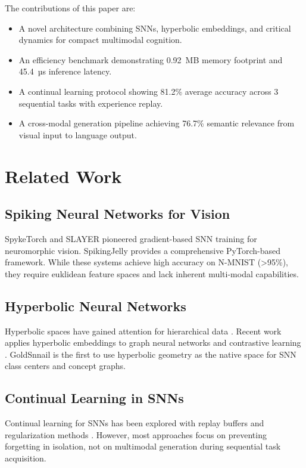 \documentclass[conference]{IEEEtran}
\begin{document}
The contributions of this paper are:
\begin{itemize}
    \item A novel architecture combining SNNs, hyperbolic embeddings, and critical dynamics for compact multimodal cognition.
    \item An efficiency benchmark demonstrating 0.92~MB memory footprint and 45.4~µs inference latency.
    \item A continual learning protocol showing 81.2\% average accuracy across 3 sequential tasks with experience replay.
    \item A cross-modal generation pipeline achieving 76.7\% semantic relevance from visual input to language output.
\end{itemize}

\section{Related Work}

\subsection{Spiking Neural Networks for Vision}
SpykeTorch \cite{spiketorch} and SLAYER \cite{slayer} pioneered gradient-based SNN training for neuromorphic vision. SpikingJelly \cite{spikingjelly} provides a comprehensive PyTorch-based framework. While these systems achieve high accuracy on N-MNIST (>95\%), they require euklidean feature spaces and lack inherent multi-modal capabilities.

\subsection{Hyperbolic Neural Networks}
Hyperbolic spaces have gained attention for hierarchical data \cite{hyperbolic_nn}. Recent work applies hyperbolic embeddings to graph neural networks \cite{hyperbolic_gnn} and contrastive learning \cite{hyperbolic_cl}. GoldSnnail is the first to use hyperbolic geometry as the native space for SNN class centers and concept graphs.

\subsection{Continual Learning in SNNs}
Continual learning for SNNs has been explored with replay buffers \cite{snn_replay} and regularization methods \cite{snn_ewc}. However, most approaches focus on preventing forgetting in isolation, not on multimodal generation during sequential task acquisition.
\end{document}
